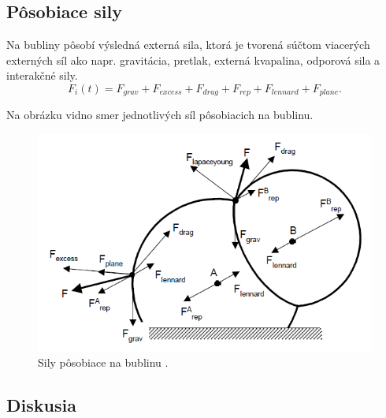 \subsection{Pôsobiace sily}

Na bubliny pôsobí výsledná externá sila, ktorá je tvorená súčtom viacerých externých síl ako napr. gravitácia, pretlak, externá kvapalina, odporová sila a interakčné sily.
\begin{equation}
	F_{i}(t)=F_{grav}+F_{excess}+F_{drag}+F_{rep}+F_{lennard}+F_{plane}.	
\end{equation}
\begin{minipage}{\linewidth}
	Na obrázku  vidno smer jednotlivých síl pôsobiacich na bublinu.
	\begin{figure}[H]
		\begin{center}
			\includegraphics[height=\imageHeight]{images/durikovic/forces}
			\caption{Sily pôsobiace na bublinu \cite{durikovic2001}.}
			\label{img:forces}
		\end{center}
	\end{figure}
\end{minipage}

\subsection{Diskusia}

